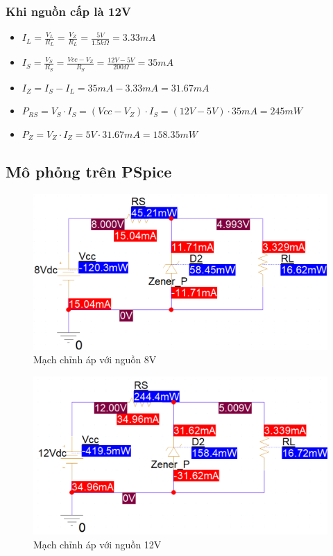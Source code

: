 \subsubsection{Khi nguồn cấp là 12V}
\begin{itemize}
    \item \(I_{L} = \frac{V_{L}}{R_{L}} = \frac{V_{Z}}{R_{L}} = \frac{5V}{1.5k\Omega} = 3.33mA\) 
    \item \(I_{S} = \frac{V_{S}}{R_{S}} = \frac{Vcc - V_{Z}}{R_{S}} = \frac{12V - 5V}{200\Omega} = 35mA\) 
    \item \(I_{Z} = I_{S} - I_{L} = 35mA - 3.33mA = 31.67mA\) 
    \item \(P_{RS} = V_{S} \cdot I_{S} = (Vcc - V_{Z}) \cdot I_{S} = (12V - 5V) \cdot 35mA = 245mW\)
    \item \(P_{Z} = V_{Z} \cdot I_{Z} = 5V \cdot 31.67mA = 158.35mW\)
\end{itemize}
\subsection{Mô phỏng trên PSpice}
\begin{figure}[H]
    \centering
    \includegraphics[width=1\textwidth]{graphics/ex8/f3.png}
    \caption{Mạch chỉnh áp với nguồn 8V}
\end{figure}

\begin{figure}[H]
    \centering
    \includegraphics[width=1\textwidth]{graphics/ex8/f4.png}
    \caption{Mạch chỉnh áp với nguồn 12V}
\end{figure}

